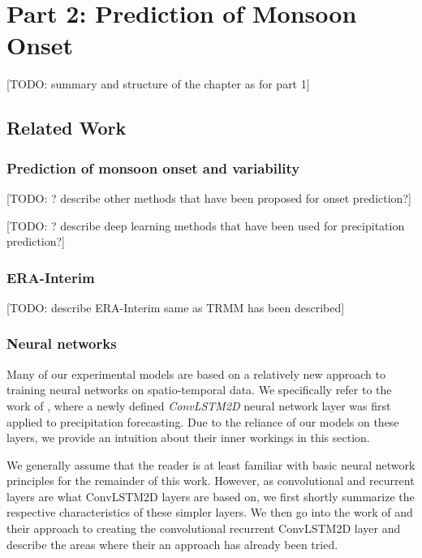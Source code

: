 \chapter{Part 2: Prediction of Monsoon Onset}
\label{c:part2}
[TODO: summary and structure of the chapter as for part 1]

\section{Related Work}
\subsection{Prediction of monsoon onset and variability}
\label{sst:related_prediction}
[TODO: ? describe other methods that have been proposed for onset prediction?]

[TODO: ? describe deep learning methods that have been used for precipitation prediction?]


\clearpage
\subsection{ERA-Interim}
\label{sst:era_interim}
[TODO: describe ERA-Interim same as TRMM has been described]

\clearpage
\subsection{Neural networks}
\label{sst:conv_recurrent_networks}
Many of our experimental models are based on a relatively new approach to training neural networks on spatio-temporal data. We specifically refer to the work of \citet{Shi.2015}, where a newly defined \textit{ConvLSTM2D} neural network layer was first applied to precipitation forecasting. Due to the reliance of our models on these layers, we provide an intuition about their inner workings in this section.

We generally assume that the reader is at least familiar with basic neural network principles for the remainder of this work. However, as convolutional and recurrent layers are what ConvLSTM2D layers are based on, we first shortly summarize the respective characteristics of these simpler layers. We then go into the work of \citet{Shi.2015} and their approach to creating the convolutional recurrent ConvLSTM2D layer and describe the areas where their an approach has already been tried.

